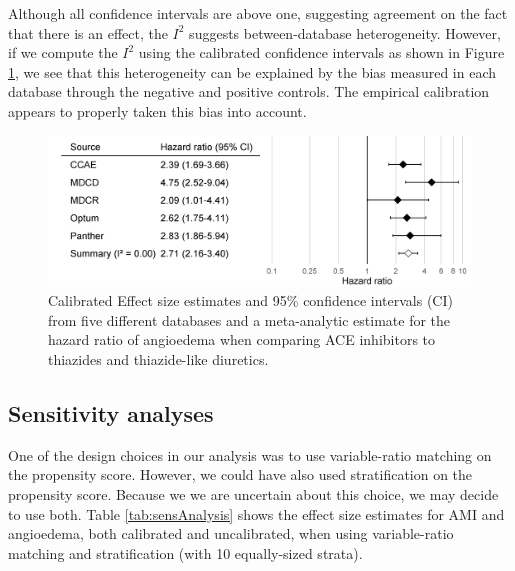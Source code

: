 \documentclass[11pt]{book}
\theoremstyle{definition}
\theoremstyle{definition}
\theoremstyle{definition}
\theoremstyle{remark}
\begin{document}
Although all confidence intervals are above one, suggesting agreement on the fact that there is an effect, the \(I^2\) suggests between-database heterogeneity. However, if we compute the \(I^2\) using the calibrated confidence intervals as shown in Figure \ref{fig:forestCal}, we see that this heterogeneity can be explained by the bias measured in each database through the negative and positive controls. The empirical calibration appears to properly taken this bias into account.

\begin{figure}

{\centering \includegraphics[width=0.9\linewidth]{images/MethodValidity/forestCal} 

}

\caption{Calibrated Effect size estimates and 95\% confidence intervals (CI) from five different databases and a meta-analytic estimate for the hazard ratio of angioedema when comparing ACE inhibitors to thiazides and thiazide-like diuretics.}\label{fig:forestCal}
\end{figure}

\hypertarget{sensitivity-analyses-1}{%
\subsection{Sensitivity analyses}\label{sensitivity-analyses-1}}

One of the design choices in our analysis was to use variable-ratio matching on the propensity score. However, we could have also used stratification on the propensity score. Because we we are uncertain about this choice, we may decide to use both. Table \ref{tab:sensAnalysis} shows the effect size estimates for AMI and angioedema, both calibrated and uncalibrated, when using variable-ratio matching and stratification (with 10 equally-sized strata).
\end{document}
